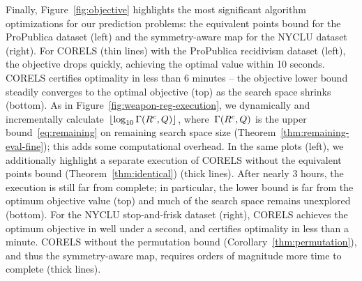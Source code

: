 Finally, Figure~\ref{fig:objective} highlights the most significant
algorithm optimizations for our prediction problems:
the equivalent points bound for the ProPublica dataset (left)
and the symmetry-aware map for the NYCLU dataset (right).
%
For CORELS (thin lines) with the ProPublica recidivism dataset (left),
the objective drops quickly, achieving the optimal value within 10 seconds.
CORELS certifies optimality in less than 6 minutes --
the objective lower bound steadily converges to the optimal objective (top)
as the search space shrinks (bottom).
%
As in Figure~\ref{fig:weapon-reg-execution}, we dynamically and incrementally
calculate~$\lfloor \log_{10} \Gamma({R^c}, Q) \rfloor$,
where~$\Gamma({R^c}, Q)$
is the upper bound~\eqref{eq:remaining} on remaining search space size
(Theorem~\ref{thm:remaining-eval-fine}); this adds some computational overhead.
%
In the same plots (left), we additionally highlight
a separate execution of CORELS without the equivalent points bound
(Theorem~\ref{thm:identical}) (thick lines).
%
After nearly 3 hours, the execution is still far from complete;
in particular, the lower bound is far from the optimum objective value (top)
and much of the search space remains unexplored (bottom).
%
For the NYCLU stop-and-frisk dataset (right),
CORELS achieves the optimum objective in well under a second,
and certifies optimality in less than a minute.
%
CORELS without the permutation bound (Corollary~\ref{thm:permutation}),
and thus the symmetry-aware map,
requires orders of magnitude more time to complete (thick lines).


